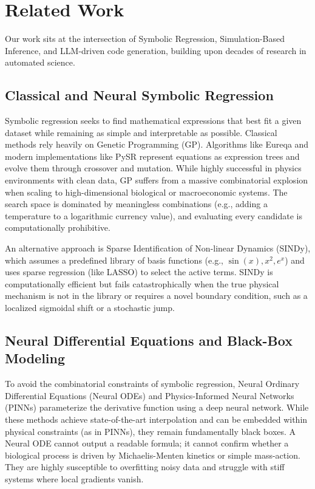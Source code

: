 \section{Related Work}
\label{sec:related}

Our work sits at the intersection of Symbolic Regression, Simulation-Based Inference, and LLM-driven code generation, building upon decades of research in automated science.

\subsection{Classical and Neural Symbolic Regression}
Symbolic regression seeks to find mathematical expressions that best fit a given dataset while remaining as simple and interpretable as possible. Classical methods rely heavily on Genetic Programming (GP). Algorithms like Eureqa and modern implementations like PySR represent equations as expression trees and evolve them through crossover and mutation. While highly successful in physics environments with clean data, GP suffers from a massive combinatorial explosion when scaling to high-dimensional biological or macroeconomic systems. The search space is dominated by meaningless combinations (e.g., adding a temperature to a logarithmic currency value), and evaluating every candidate is computationally prohibitive.

An alternative approach is Sparse Identification of Non-linear Dynamics (SINDy), which assumes a predefined library of basis functions (e.g., $\sin(x), x^2, e^x$) and uses sparse regression (like LASSO) to select the active terms. SINDy is computationally efficient but fails catastrophically when the true physical mechanism is not in the library or requires a novel boundary condition, such as a localized sigmoidal shift or a stochastic jump.

\subsection{Neural Differential Equations and Black-Box Modeling}
To avoid the combinatorial constraints of symbolic regression, Neural Ordinary Differential Equations (Neural ODEs) and Physics-Informed Neural Networks (PINNs) parameterize the derivative function using a deep neural network. While these methods achieve state-of-the-art interpolation and can be embedded within physical constraints (as in PINNs), they remain fundamentally black boxes. A Neural ODE cannot output a readable formula; it cannot confirm whether a biological process is driven by Michaelis-Menten kinetics or simple mass-action. They are highly susceptible to overfitting noisy data and struggle with stiff systems where local gradients vanish.

